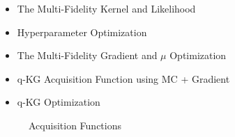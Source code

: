 \documentclass[12pt]{article}
\begin{document}
\begin{itemize}
  \item The Multi-Fidelity Kernel and Likelihood
  \item Hyperparameter Optimization
  \item The Multi-Fidelity Gradient and $\mu$ Optimization
  \item q-KG Acquisition Function using MC + Gradient
  \item q-KG Optimization
\end{itemize}

\begin{figure}[h]
\centering
{}
\caption{Acquisition Functions}
\end{figure}
\end{document}
